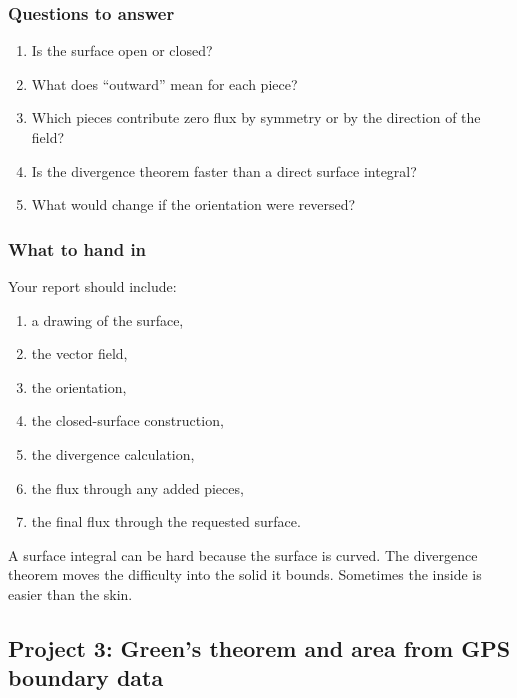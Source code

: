 \subsubsection*{Questions to answer}

\begin{enumerate}
\item Is the surface open or closed?

\item What does ``outward'' mean for each piece?

\item Which pieces contribute zero flux by symmetry or by the direction of the field?

\item Is the divergence theorem faster than a direct surface integral?

\item What would change if the orientation were reversed?
\end{enumerate}

\subsubsection*{What to hand in}

Your report should include:

\begin{enumerate}
\item a drawing of the surface,

\item the vector field,

\item the orientation,

\item the closed-surface construction,

\item the divergence calculation,

\item the flux through any added pieces,

\item the final flux through the requested surface.
\end{enumerate}

A surface integral can be hard because the surface is curved.  The divergence theorem
moves the difficulty into the solid it bounds.  Sometimes the inside is easier than the
skin.

\subsection{Project 3: Green's theorem and area from GPS boundary data}

